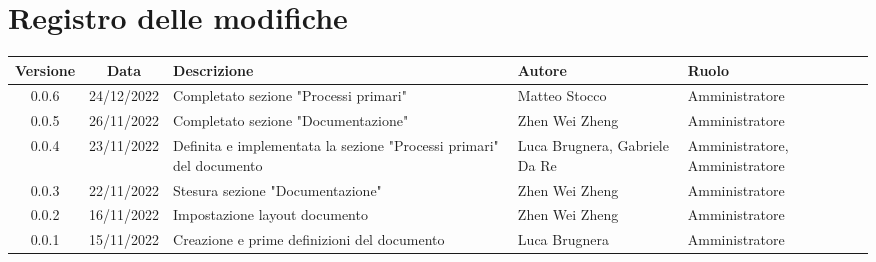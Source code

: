 \section*{Registro delle modifiche}
\begin{center}
\renewcommand\tabularxcolumn[1]{>{\Centering}m{#1}}
\begin{tabularx}{\textwidth}{| c | c | X | X | X |} 
\hline
 \textbf{Versione} & \textbf{Data} & \textbf{Descrizione} & \textbf{Autore} & \textbf{Ruolo}\\
 \hline
 0.0.6 & 24/12/2022 & Completato sezione "Processi primari" & Matteo Stocco & Amministratore\\
 \hline
 0.0.5 & 26/11/2022 & Completato sezione "Documentazione" & Zhen Wei Zheng & Amministratore\\
 \hline
 0.0.4 & 23/11/2022 &  Definita e implementata la sezione "Processi primari" del documento & Luca Brugnera, Gabriele Da Re & Amministratore, Amministratore\\
 \hline
 0.0.3 & 22/11/2022 & Stesura sezione "Documentazione" & Zhen Wei Zheng & Amministratore\\
 \hline
 0.0.2 & 16/11/2022 & Impostazione layout documento & Zhen Wei Zheng & Amministratore\\
 \hline
 0.0.1 & 15/11/2022 & Creazione e prime definizioni del documento & Luca Brugnera & Amministratore\\
 \hline
\end{tabularx}
\end{center}
